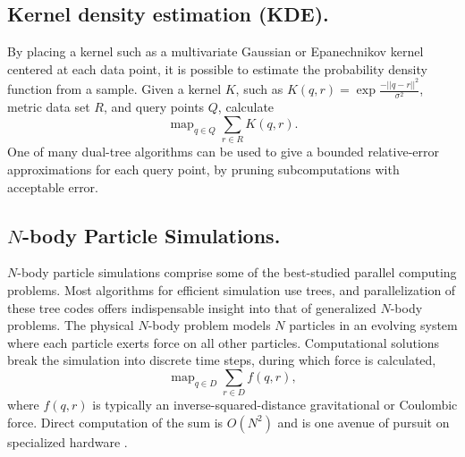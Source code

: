 \documentclass[twoside,leqno,twocolumn]{article}
\DeclareMathOperator*{\map}{map}
\DeclareMathOperator*{\argmin}{argmin}
\newcommand{\mysub}[1]{\subsection{#1.}}
\newcommand{\ocpos}[1]{c^{+}_{#1}}
\newcommand{\cpos}[2]{\ocpos{#1 \neq #2}}
\newcommand{\simil}[2]{S_{#1#2}}
\newcommand{\vecrho}{\vec{\rho}}
\newcommand{\vecalpha}{\vec{\alpha}}
\newcommand{\frho}[1]{\rho_{#1}}
\newcommand{\falpha}[1]{\alpha_{#1}}
\newcommand{\falphaj}[2]{\alpha_{#1[#2]}}
\begin{document}
\mysub{Kernel density estimation (KDE)}
By placing a kernel such as a multivariate Gaussian or Epanechnikov kernel centered at each data point, it is possible to estimate the probability density function from a sample.
Given a kernel $K$, such as $K(q,r) = \exp{\frac{-||q-r||^2}{\sigma^2}}$, metric data set $R$, and query points $Q$, calculate
\[\map_{q \in Q} \sum_{r \in R} K(q, r).\]
One of many dual-tree algorithms \cite{gray_kde, lee_gauss1, lee_gauss2} can be used to give a bounded relative-error approximations for each query point, by pruning subcomputations with acceptable error.



\mysub{$N$-body Particle Simulations}

$N$-body particle simulations comprise some of the best-studied parallel computing problems.
Most algorithms for efficient simulation use trees, and parallelization of these tree codes offers indispensable insight into that of generalized $N$-body problems.
The physical $N$-body problem models $N$ particles in an evolving system where each particle exerts force on all other particles.
Computational solutions break the simulation into discrete time steps, during which force is calculated,
\[\map_{q \in D} \sum_{r \in D} f(q,r),\]
\noindent where $f(q,r)$ is typically an inverse-squared-distance gravitational or Coulombic force.
Direct computation of the sum is $O(N^2)$ and is one avenue of pursuit on specialized hardware \cite{grape}.
\end{document}
